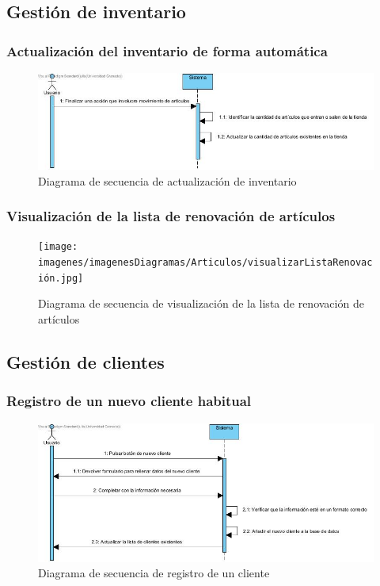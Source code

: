 \subsection{Gestión de inventario}

\subsubsection{Actualización del inventario de forma automática}

\begin{figure}[H]
	\centering
	\includegraphics[width=1\textwidth]{imagenes/imagenesDiagramas/Articulos/actualizarInventario.jpg}
	\caption{Diagrama de secuencia de actualización de inventario}
	\label{fig:seqdiag10}
\end{figure}

\subsubsection{Visualización de la lista de renovación de artículos}

\begin{figure}[H]
	\centering
	\texttt{[image: imagenes/imagenesDiagramas/Articulos/visualizarListaRenovación.jpg]}
	\caption{Diagrama de secuencia de visualización de la lista de renovación de artículos}
	\label{fig:seqdiag11}
\end{figure}

\subsection{Gestión de clientes}

\subsubsection{Registro de un nuevo cliente habitual}

\begin{figure}[H]
	\centering
	\includegraphics[width=1\textwidth]{imagenes/imagenesDiagramas/Cliente/nuevoCliente.jpg}
	\caption{Diagrama de secuencia de registro de un cliente}
	\label{fig:seqdiag12}
\end{figure}

